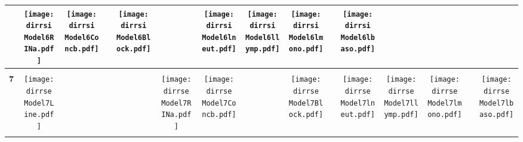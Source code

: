 \documentclass[landscape]{article}
\def \dirrsi{/run/user/1000/gvfs/smb-share:server=cyfiles.iastate.edu,share=09/22/ntyet/R/RA/Data/RFI-newdata/resultsimulation/Model6.Line.Concb.RINb.RINa.lneut.llymp.lmono.lbaso.Block/}
\def \dirrse{/run/user/1000/gvfs/smb-share:server=cyfiles.iastate.edu,share=09/22/ntyet/R/RA/Data/RFI-newdata/resultsimulation/Model7.Line.Concb.RINa.lneut.llymp.lmono.lbaso.Block/}
\begin{document}
\begin{table}
\begin{tabular}{ccccccccccccccc}
      &\texttt{[image: \\dirrsi Model6RINa.pdf]}
      &\texttt{[image: \\dirrsi Model6Concb.pdf]}
      &
      &\texttt{[image: \\dirrsi Model6Block.pdf]}
      &
      &\texttt{[image: \\dirrsi Model6lneut.pdf]}
      &\texttt{[image: \\dirrsi Model6llymp.pdf]}
      &\texttt{[image: \\dirrsi Model6lmono.pdf]}
      &
      &\texttt{[image: \\dirrsi Model6lbaso.pdf]}
     \\[3.5pt]
     \hline
     \\[3.5pt]
     {\Huge \textbf{7}} 
      &\texttt{[image: \\dirrse Model7Line.pdf]}
      &
      &
      &
      &\texttt{[image: \\dirrse Model7RINa.pdf]}
      &\texttt{[image: \\dirrse Model7Concb.pdf]}
      &
      &\texttt{[image: \\dirrse Model7Block.pdf]}
      &
      &\texttt{[image: \\dirrse Model7lneut.pdf]}
      &\texttt{[image: \\dirrse Model7llymp.pdf]}
      &\texttt{[image: \\dirrse Model7lmono.pdf]}
      &
      &\texttt{[image: \\dirrse Model7lbaso.pdf]}
     \\[3.5pt]
     \hline
     \\[3.5pt]

\end{tabular}
\end{table}
\end{document}
